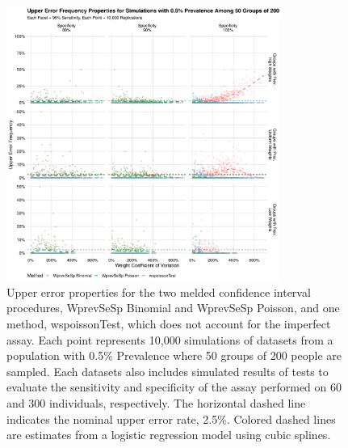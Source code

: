 \documentclass[AMA,STIX1COL]{WileyNJD-v2}
\begin{document}
\begin{figure}
\centering
\includegraphics[width=0.8\textwidth]{figures/imperfect_upper_error_frequency_50_groups_0_005_prev.pdf}
\caption{Upper error properties for the two melded confidence interval procedures, WprevSeSp Binomial and WprevSeSp Poisson, and one method, wspoissonTest, which does not account for the imperfect assay.
Each point represents 10,000 simulations of datasets from a population with 0.5\% Prevalence where 50 groups of 200 people are sampled.
Each datasets also includes simulated results of tests to evaluate the sensitivity and specificity of the assay performed on 60 and 300 individuals, respectively.
The horizontal dashed line indicates the nominal upper error rate, 2.5\%.
Colored dashed lines are estimates from a logistic regression model using cubic splines.}
\label{fig:imperfect_upper_error_frequency_50_groups_0_005_prev}
\end{figure}
\end{document}
